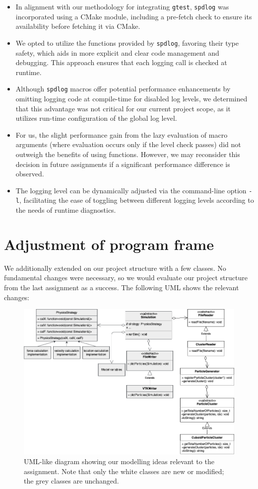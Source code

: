 \documentclass{article}
\begin{document}
\begin{itemize}
    \item In alignment with our methodology for integrating \verb|gtest|, \verb|spdlog| was incorporated using a CMake module, including a pre-fetch check to ensure its availability before fetching it via CMake.
    \item We opted to utilize the functions provided by \verb|spdlog|, favoring their type safety, which aids in more explicit and clear code management and debugging. This approach ensures that each logging call is checked at runtime.
    \item Although \verb|spdlog| macros offer potential performance enhancements by omitting logging code at compile-time for disabled log levels, we determined that this advantage was not critical for our current project scope, as it utilizes run-time configuration of the global log level.
    \item For us, the slight performance gain from the lazy evaluation of macro arguments (where evaluation occurs only if the level check passes) did not outweigh the benefits of using functions. However, we may reconsider this decision in future assignments if a significant performance difference is observed.
    \item The logging level can be dynamically adjusted via the command-line option \texttt{-l}, facilitating the ease of toggling between different logging levels according to the needs of runtime diagnostics.
\end{itemize}

\section{Adjustment of program frame}
\label{sec:adj}
We additionally extended on our project structure with a few classes. 
No fundamental changes were necessary, so we would evaluate our project structure from the last assignment as a success. The following UML shows the relevant changes:
\begin{figure}[H]
    \includegraphics[width=\textwidth]{res/UML.png}
    \caption{UML-like diagram showing our modelling ideas relevant to the assignment. Note that only the white classes are new or modified; the grey classes are unchanged.}
\end{figure}
\end{document}
